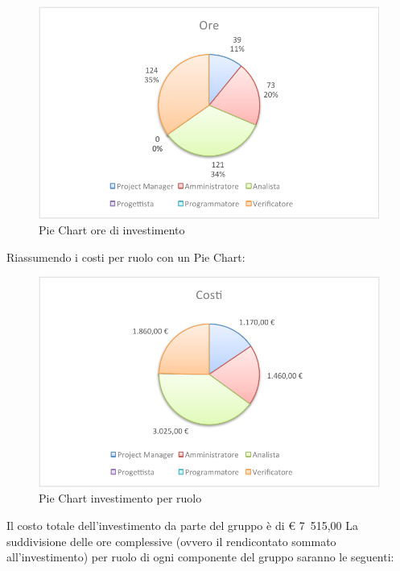 				\begin{figure}[H]\centering
					\includegraphics[width=\textwidth]{PianoDiProgetto/Pics/ChartTotOreInvest.pdf}
					\caption{Pie Chart ore di investimento}
				\end{figure}
				Riassumendo i costi per ruolo con un Pie Chart:
				\begin{figure}[H]\centering
					\includegraphics[width=\textwidth]{PianoDiProgetto/Pics/ChartTotCostiInvest.pdf}
					\caption{Pie Chart investimento per ruolo}
				\end{figure}
				Il costo totale dell'investimento da parte del gruppo è di \euro{} 7~515,00 
				La suddivisione delle ore complessive (ovvero il rendicontato sommato all'investimento) per ruolo di ogni componente del gruppo \groupname{} saranno le seguenti:
